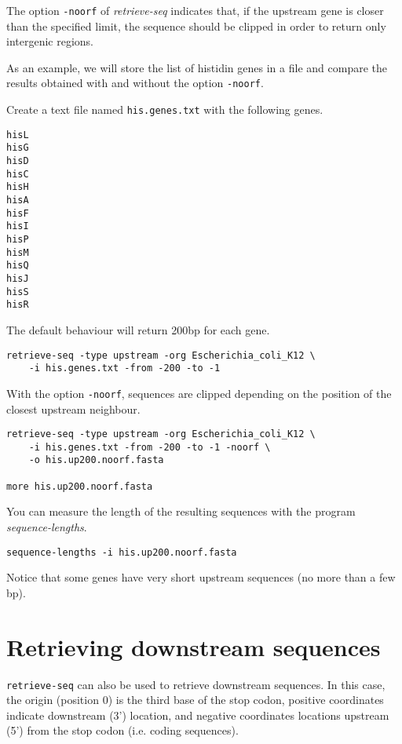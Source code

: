 The option \texttt{-noorf} of \textit{retrieve-seq} indicates that, if
the upstream gene is closer than the specified limit, the sequence
should be clipped in order to return only intergenic regions.

As an example, we will store the list of histidin genes in a file and
compare the results obtained with and without the option
\texttt{-noorf}.

Create a text file named \texttt{his.genes.txt} with the following
genes.

\begin{verbatim}
hisL
hisG
hisD
hisC
hisH
hisA
hisF
hisI
hisP
hisM
hisQ
hisJ
hisS
hisR
\end{verbatim}

The default behaviour will return 200bp for each gene. 

\begin{verbatim}
retrieve-seq -type upstream -org Escherichia_coli_K12 \
    -i his.genes.txt -from -200 -to -1
\end{verbatim}

With the option \texttt{-noorf}, sequences are clipped depending on
the position of the closest upstream neighbour.

\begin{verbatim}
retrieve-seq -type upstream -org Escherichia_coli_K12 \
    -i his.genes.txt -from -200 -to -1 -noorf \
    -o his.up200.noorf.fasta

more his.up200.noorf.fasta
\end{verbatim}

You can measure the length of the resulting sequences with the program
\textit{sequence-lengths}.

\begin{verbatim}
sequence-lengths -i his.up200.noorf.fasta
\end{verbatim}

Notice that some genes have very short upstream sequences (no more
than a few bp).

\section{Retrieving downstream sequences}

\texttt{retrieve-seq} can also be used to retrieve downstream
sequences. In this case, the origin (position 0) is the third base of
the stop codon, positive coordinates indicate downstream (3')
location, and negative coordinates locations upstream (5') from the
stop codon (i.e. coding sequences). 

